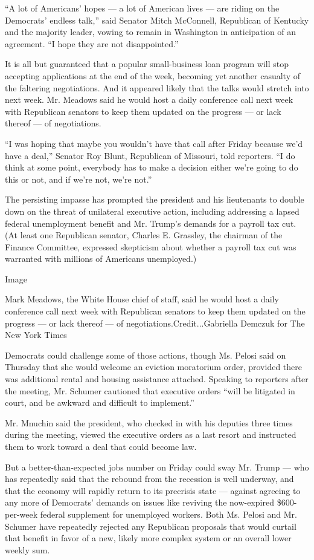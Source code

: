 ``A lot of Americans' hopes --- a lot of American lives --- are riding
on the Democrats' endless talk,'' said Senator Mitch McConnell,
Republican of Kentucky and the majority leader, vowing to remain in
Washington in anticipation of an agreement. ``I hope they are not
disappointed.''

It is all but guaranteed that a popular small-business loan program will
stop accepting applications at the end of the week, becoming yet another
casualty of the faltering negotiations. And it appeared likely that the
talks would stretch into next week. Mr. Meadows said he would host a
daily conference call next week with Republican senators to keep them
updated on the progress --- or lack thereof --- of negotiations.

``I was hoping that maybe you wouldn't have that call after Friday
because we'd have a deal,'' Senator Roy Blunt, Republican of Missouri,
told reporters. ``I do think at some point, everybody has to make a
decision either we're going to do this or not, and if we're not, we're
not.''

The persisting impasse has prompted the president and his lieutenants to
double down on the threat of unilateral executive action, including
addressing a lapsed federal unemployment benefit and Mr. Trump's demands
for a payroll tax cut. (At least one Republican senator, Charles E.
Grassley, the chairman of the Finance Committee, expressed skepticism
about whether a payroll tax cut was warranted with millions of Americans
unemployed.)

Image

Mark Meadows, the White House chief of staff, said he would host a daily
conference call next week with Republican senators to keep them updated
on the progress --- or lack thereof --- of
negotiations.Credit...Gabriella Demczuk for The New York Times

Democrats could challenge some of those actions, though Ms. Pelosi said
on Thursday that she would welcome an eviction moratorium order,
provided there was additional rental and housing assistance attached.
Speaking to reporters after the meeting, Mr. Schumer cautioned that
executive orders ``will be litigated in court, and be awkward and
difficult to implement.''

Mr. Mnuchin said the president, who checked in with his deputies three
times during the meeting, viewed the executive orders as a last resort
and instructed them to work toward a deal that could become law.

But a better-than-expected jobs number on Friday could sway Mr. Trump
--- who has repeatedly said that the rebound from the recession is well
underway, and that the economy will rapidly return to its precrisis
state --- against agreeing to any more of Democrats' demands on issues
like reviving the now-expired \$600-per-week federal supplement for
unemployed workers. Both Ms. Pelosi and Mr. Schumer have repeatedly
rejected any Republican proposals that would curtail that benefit in
favor of a new, likely more complex system or an overall lower weekly
sum.

